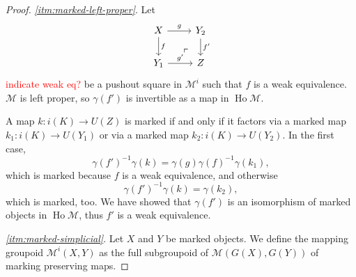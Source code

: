 \documentclass{article}
\newcommand{\todo}[1]{\textcolor{red}{#1}}
\theoremstyle{remark}
\theoremstyle{definition}
\begin{document}
\begin{proof}
  \emph{\ref{itm:marked-left-proper}}.
  Let 
  \begin{equation}
    \begin{tikzcd}
      X \arrow[r, "g"] \arrow[d, "f"] \arrow[dr, phantom, near end, "\ulcorner"] & Y_2 \arrow[d, "f'"] \\
      Y_1 \arrow[r, "g'"] & Z
    \end{tikzcd}
  \end{equation}
  \todo{indicate weak eq?}
  be a pushout square in $\mathcal{M}^i$ such that $f$ is a weak equivalence.
  $\mathcal{M}$ is left proper, so $\gamma(f')$ is invertible as a map in $\operatorname{Ho} \mathcal{M}$.

  A map $k : i(K) \rightarrow U(Z)$ is marked if and only if it factors via a marked map $k_1 : i(K) \rightarrow U(Y_1)$ or via a marked map $k_2 : i(K) \rightarrow U(Y_2)$.
  In the first case,
  \begin{equation}
    \gamma(f')^{-1} \gamma(k) = \gamma(g) \gamma(f)^{-1} \gamma(k_1),
  \end{equation}
  which is marked because $f$ is a weak equivalence, and otherwise
  \begin{equation}
    \gamma(f')^{-1} \gamma(k) = \gamma(k_2),
  \end{equation}
  which is marked, too.
  We have showed that $\gamma(f')$ is an isomorphism of marked objects in $\operatorname{Ho} \mathcal{M}$, thus $f'$ is a weak equivalence.

  \emph{\ref{itm:marked-simplicial}}.
  Let $X$ and $Y$ be marked objects.
  We define the mapping groupoid $\mathcal{M}^i(X, Y)$ as the full subgroupoid of $\mathcal{M}(G(X), G(Y))$ of marking preserving maps.


\end{proof}
\end{document}
